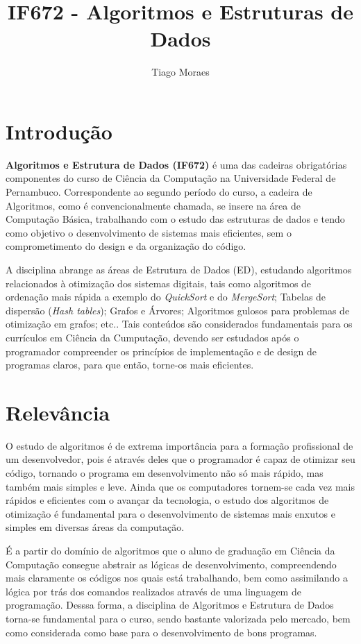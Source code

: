 \documentclass[a4paper]{article}
\title{IF672 - Algoritmos e Estruturas de Dados}
\author{Tiago Moraes}
\begin{document}
\maketitle

\section{Introdução}
\textbf{Algoritmos e Estrutura de Dados (IF672)} é uma das cadeiras obrigatórias componentes do curso de Ciência da Computação na Universidade Federal de Pernambuco. Correspondente ao segundo período do curso, a cadeira de Algoritmos, como é convencionalmente chamada, se insere na área de Computação Básica, trabalhando com o estudo das estruturas de dados e tendo como objetivo o desenvolvimento de sistemas mais eficientes, sem o comprometimento do design e da organização do código.

A disciplina abrange as áreas de Estrutura de Dados (ED), estudando algoritmos relacionados à otimização dos sistemas digitais, tais como algoritmos de ordenação mais rápida a exemplo do \textit{QuickSort} e do \textit{MergeSort}; Tabelas de dispersão (\textit{Hash tables}); Grafos e Árvores; Algoritmos gulosos para problemas de otimização em grafos; etc.. Tais conteúdos são considerados fundamentais para os currículos em Ciência da Cumputação, devendo ser estudados após o programador compreender os princípios de implementação e de design de programas claros, para que então, torne-os mais eficientes.

\section{Relevância}
O estudo de algoritmos é de extrema importância para a formação profissional de um desenvolvedor, pois é através deles que o programador é capaz de otimizar seu código, tornando o programa em desenvolvimento não só mais rápido, mas também mais simples e leve. Ainda que os computadores tornem-se cada vez mais rápidos e eficientes com o avançar da tecnologia, o estudo dos algoritmos de otimização é fundamental para o desenvolvimento de sistemas mais enxutos e simples em diversas áreas da computação.

É a partir do domínio de algoritmos que o aluno de graduação em Ciência da Computação consegue abstrair as lógicas de desenvolvimento, compreendendo mais claramente os códigos nos quais está trabalhando, bem como assimilando a lógica por trás dos comandos realizados através de uma linguagem de programação. Desssa forma, a disciplina de Algoritmos e Estrutura de Dados torna-se fundamental para o curso, sendo bastante valorizada pelo mercado, bem como considerada como base para o desenvolvimento de bons programas.
\end{document}
